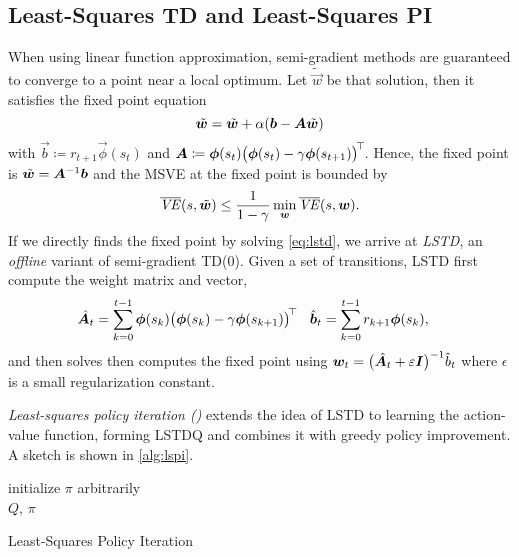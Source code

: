 		\subsection{Least-Squares \acs{TD} and Least-Squares \acs{PI}}
			When using linear function approximation, semi-gradient methods are guaranteed to converge to a point near a local optimum. Let \(\tilde{\vec{w}}\) be that solution, then it satisfies the fixed point equation
			\begin{equation}
				\tilde{\bm{w}} = \tilde{\bm{w}} + \alpha (\bm{b} - \bm{A} \tilde{\bm{w}})  \label{eq:lstd}
			\end{equation}
			with \( \vec{b} \coloneqq r_{t + 1} \vec{\phi}(s_t) \) and \( \bm{A} \coloneqq \bm{\phi}(s_t) \bigl( \bm{\phi}(s_t) - \gamma \bm{\phi}(s_{t + 1}) \bigr)^{\!\top\!} \). Hence, the fixed point is \( \tilde{\bm{w}} = \bm{A}^{-1} \bm{b} \) and the \ac{MSVE} at the fixed point is bounded by
			\begin{equation}
				\overline{\mathit{VE}}(s, \tilde{\bm{w}}) \leq \frac{1}{1 - \gamma} \min_{\bm{w}} \overline{\mathit{VE}}(s, \bm{w}).
			\end{equation}
			If we directly finds the fixed point by solving \eqref{eq:lstd}, we arrive at \emph{\ac{LSTD}}, an \emph{offline} variant of semi-gradient \acs{TD}(\(0\)). Given a set of transitions, \ac{LSTD} first compute the weight matrix and vector,
			\begin{align}
				\hat{\bm{A}}_t & = \sum_{k = 0}^{t - 1} \bm{\phi}(s_k) \bigl( \bm{\phi}(s_k) - \gamma \bm{\phi}(s_{k + 1}) \bigr)^{\!\top\!} &
				\hat{\bm{b}}_t & = \sum_{k = 0}^{t - 1} r_{k + 1} \bm{\phi}(s_k),
			\end{align}
			and then solves then computes the fixed point using \( \bm{w}_t = \bigl( \hat{\bm{A}}_t + \varepsilon \bm{I} \bigr)^{-1} \hat{b}_t \) where \( \epsilon \) is a small regularization constant.

			\emph{Least-squares policy iteration ()} extends the idea of \ac{LSTD} to learning the action-value function, forming \ac{LSTDQ} and combines it with greedy policy improvement. A sketch is shown in \autoref{alg:lspi}.

			\begin{algorithm}  \DontPrintSemicolon
				initialize \(\pi\) arbitrarily \\
				\Return \(Q\), \(\pi\)
				\caption{Least-Squares Policy Iteration}
				\label{alg:lspi}
			\end{algorithm}

